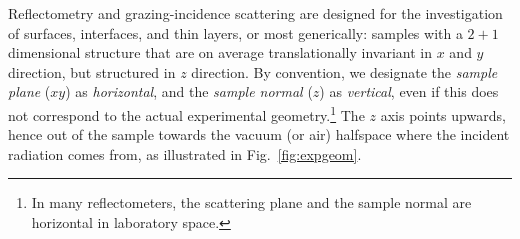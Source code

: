 Reflectometry and grazing-incidence scattering
are designed for the investigation of surfaces, interfaces, and thin layers,
or most generically:
samples with a $2+1$ dimensional structure
that are on average translationally invariant in $x$ and $y$ direction,
but structured in $z$ direction.
By convention,
we designate the \textit{sample plane} ($xy$) as \textit{horizontal},
%
%
and the \textit{sample normal} ($z$) as \textit{vertical},
%
%
even if this does not correspond to the actual experimental geometry.\footnote
{In many reflectometers,
 the scattering plane and the sample normal are horizontal in laboratory space.}
The $z$ axis points upwards, hence out of the sample towards the
vacuum (or air) halfspace where the incident radiation comes from,
as illustrated in Fig.~\ref{fig:expgeom}.

